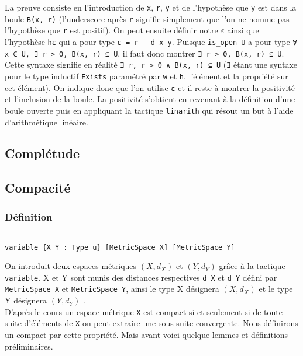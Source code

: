\documentclass[a4paper, 12pt]{article}
\newcommand{\lean}[1]{\texttt{#1}}
\begin{document}
La preuve consiste en l'introduction de \lean{x}, \lean{r}, \lean{y} et de l'hypothèse que \lean{y} est dans la boule \lean{B(x, r)} (l'underscore après \lean{r} signifie simplement que l'on ne nomme pas l'hypothèse que \lean{r} est positif). On peut ensuite définir notre $ε$ ainsi que l'hypothèse \lean{hε} qui a pour type \lean{ε = r - d x y}. Puisque \lean{is_open U} a pour type \lean{∀ x ∈ U, ∃ r > 0, B(x, r) ⊆ U}, il faut donc montrer \lean{∃ r > 0, B(x, r) ⊆ U}. Cette syntaxe signifie en réalité \lean{∃ r, r > 0 ∧ B(x, r) ⊆ U} (\lean{∃} étant une syntaxe pour le type inductif \lean{Exists} paramétré par \lean{w} et \lean{h}, l'élément et la propriété sur cet élément). On indique donc que l'on utilise \lean{ε} et il reste à montrer la positivité et l'inclusion de la boule. La positivité s'obtient en revenant à la définition d'une boule ouverte puis en appliquant la tactique \lean{linarith} qui résout un but à l'aide d'arithmétique linéaire.

\subsection{Complétude}


\subsection{Compacité}

\subsubsection{Définition}

\begin{verbatim}

variable {X Y : Type u} [MetricSpace X] [MetricSpace Y]

\end{verbatim}

On introduit deux espaces métriques $(X,d_{X})$ et  $(Y,d_{Y})$ grâce à la tactique \lean{variable}. X et Y sont munis des distances respectives \lean{d_{X}} et \lean{d_{Y}} défini par \lean{MetricSpace X} et \lean{MetricSpace Y}, ainsi le type X désignera  $(X,d_{X})$ et le type Y désignera $(Y,d_{Y})$ .\\

D'après le cours un espace métrique \lean{X} est compact si et seulement si de toute suite d'éléments de \lean{X} on peut extraire une sous-suite convergente. Nous définirons un compact par cette propriété. Mais avant voici quelque lemmes et définitions préliminaires. 
\end{document}
